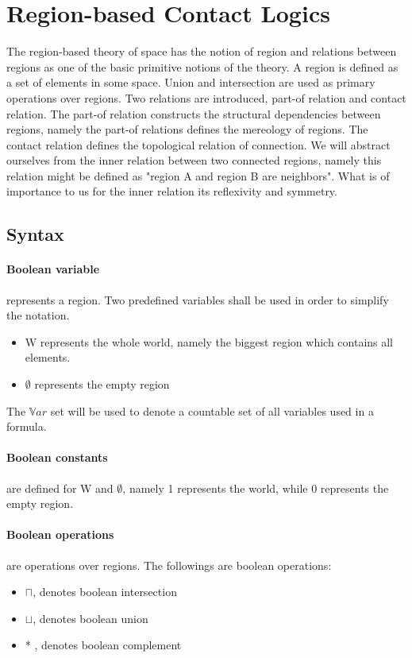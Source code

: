 \documentclass{article}
\begin{document}
	\section{Region-based Contact Logics}
The region-based theory of space has the notion of region and relations between regions as one of the basic primitive notions of the theory.
A region is defined as a set of elements in some space. Union and intersection are used as primary operations over regions.
Two relations are introduced, part-of relation and contact relation. 
The part-of relation constructs the structural dependencies between regions, namely the part-of relations defines the mereology of regions.
The contact relation defines the topological relation of connection. We will abstract ourselves from the inner relation between two connected regions, namely
this relation might be defined as "region A and region B are neighbors". What is of importance to us for the inner relation its reflexivity and symmetry.
	
	\subsection{Syntax}
	\paragraph{Boolean variable} 
represents a region. Two predefined variables shall be used in order to simplify the notation. 
		\begin{itemize}
			\item W represents the whole world, namely the biggest region which contains all elements.
			\item $\emptyset$ represents the empty region
		\end{itemize}
The $\mathbb{V}ar$ set will be used to denote a countable set of all variables used in a formula.

	\paragraph{Boolean constants}
are defined for W and $\emptyset$, namely 1 represents the world, while 0 represents the empty region.

	\paragraph{Boolean operations}
are operations over regions. The followings are boolean operations:
		\begin{itemize}
			\item $\sqcap$, denotes boolean intersection
			\item $\sqcup$, denotes boolean union
			\item * , denotes boolean complement
		\end{itemize}
\end{document}

